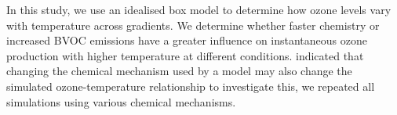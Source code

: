 In this study, we use an idealised box model to determine how ozone levels vary with temperature across  gradients.
We determine whether faster chemistry or increased BVOC emissions have a greater influence on instantaneous ozone production with higher temperature at different  conditions.
\citet{Rasmussen:2013} indicated that changing the chemical mechanism used by a model may also change the simulated ozone-temperature relationship to investigate this, we repeated all simulations using various chemical mechanisms.
